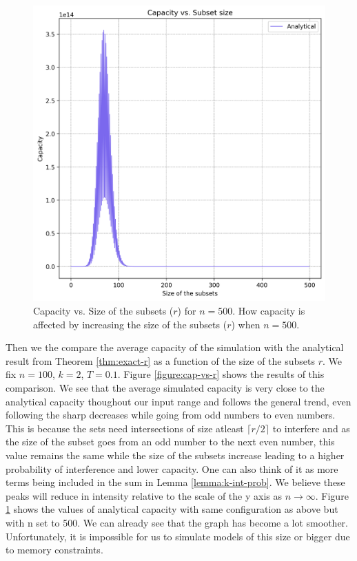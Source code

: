     \begin{figure}%
            \centering
            \includegraphics[scale=0.85]{figures/larger-n.png}
            \caption[Capacity vs. Size of the subsets ($r$) for $n = 500$]{Capacity vs. Size of the subsets ($r$) for $n = 500$. \textmd{How capacity is affected by increasing the size of the subsets ($r$) when $n = 500$.}}
            \label{figure:larger-n}
            \end{figure}

Then we the compare the average capacity of the simulation with the analytical result from Theorem \ref{thm:exact-r} as a function of the size of the subsets $r$. We fix $n=100$, $k=2$, $T=0.1$. Figure \ref{figure:cap-vs-r} shows the results of this comparison. We see that the average simulated capacity is very close to the analytical capacity thoughout our input range and follows the general trend, even following the sharp decreases while going from odd numbers to even numbers. This is because the sets need intersections of size atleast $\lceil r/2 \rceil$ to interfere and as the size of the subset goes from an odd number to the next even number, this value remains the same while the size of the subsets increase leading to a higher probability of interference and lower capacity. One can also think of it as more terms being included in the sum in Lemma \ref{lemma:k-int-prob}. We believe these peaks will reduce in intensity relative to the scale of the y axis as $n \to \infty$. Figure \ref{figure:larger-n} shows the values of analytical capacity with same configuration as above but with n set to 500. We can already see that the graph has become a lot smoother. Unfortunately, it is impossible for us to simulate models of this size or bigger due to memory constraints. 

